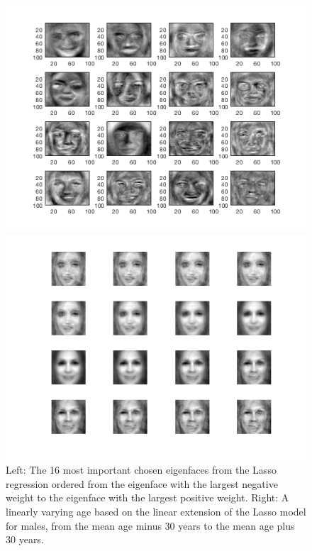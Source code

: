 \begin{figure}[ht!]
    \centering
    \begin{minipage}{0.49\textwidth}
    \includegraphics[width=1\linewidth]{fig/F_Lasso_40.png}
    \end{minipage}
    \begin{minipage}{0.49\textwidth}
    \includegraphics[width=1\linewidth]{fig/F_Age_40.png}
    \end{minipage}
    \caption{Left: The 16 most important chosen eigenfaces from the Lasso regression ordered from the eigenface with the largest negative weight to the eigenface with the largest positive weight. Right: A linearly varying age based on the linear extension of the Lasso model for males, from the mean age minus 30 years to the mean age plus 30 years.}
    \label{fig:F_Age}
\end{figure}